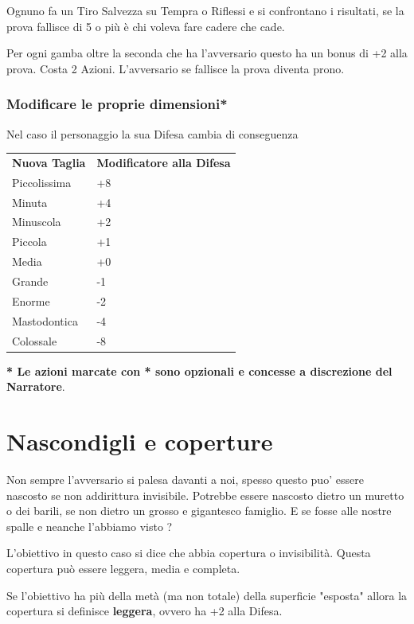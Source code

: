 \documentclass[a4paper,11pt,twoside,openany]{book}
\begin{document}
Ognuno fa un Tiro Salvezza su Tempra o Riflessi e si confrontano i risultati, se la prova fallisce di 5 o più è chi voleva fare cadere che cade.

Per ogni gamba oltre la seconda che ha l'avversario questo ha un bonus di +2 alla prova. Costa 2 Azioni. L'avversario se fallisce la prova diventa prono.

\subsubsection{Modificare le proprie dimensioni*}

Nel caso il personaggio  la sua Difesa cambia di conseguenza

\bigskip

\begin{tabular}{ll}
\toprule
\textbf{Nuova Taglia} & \textbf{Modificatore alla Difesa}\tabularnewline
Piccolissima & +8\tabularnewline
Minuta & +4\tabularnewline
Minuscola & +2\tabularnewline
Piccola & +1\tabularnewline
Media & +0\tabularnewline
Grande & -1\tabularnewline
Enorme & -2\tabularnewline
Mastodontica & -4\tabularnewline
Colossale & -8\tabularnewline

\end{tabular}

\bigskip

\textbf{{*} Le azioni marcate con {*} sono opzionali e concesse a
discrezione del Narratore}.

\pagebreak

\section{Nascondigli e coperture}

\label{nascondigli-e-coperture}
Non sempre l'avversario si palesa davanti a noi, spesso questo puo' essere nascosto se non addirittura invisibile. 
Potrebbe essere nascosto dietro un muretto o dei barili, se non dietro un grosso e gigantesco famiglio.
E se fosse alle nostre spalle e neanche l'abbiamo visto ?

L'obiettivo in questo caso si dice che abbia copertura o invisibilità. Questa copertura può essere leggera, media e completa.

Se l'obiettivo ha più della metà (ma non totale) della superficie "esposta" allora la copertura si definisce \textbf{leggera}, ovvero ha +2 alla Difesa.
\end{document}
